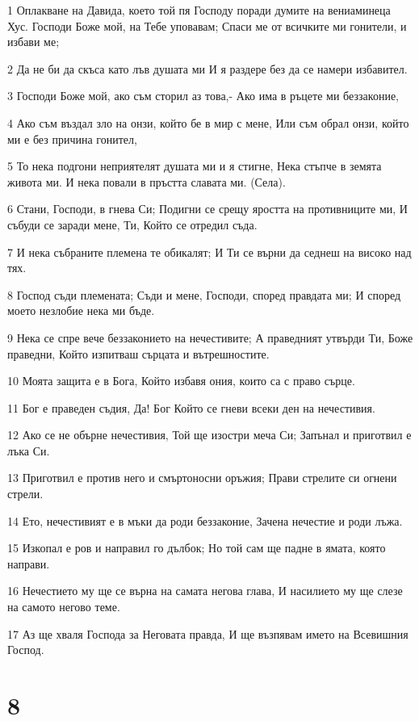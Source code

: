 \par 1 Оплакване на Давида, което той пя Господу поради думите на вениаминеца Хус. Господи Боже мой, на Тебе уповавам; Спаси ме от всичките ми гонители, и избави ме;
\par 2 Да не би да скъса като лъв душата ми И я раздере без да се намери избавител.
\par 3 Господи Боже мой, ако съм сторил аз това,- Ако има в ръцете ми беззаконие,
\par 4 Ако съм въздал зло на онзи, който бе в мир с мене, Или съм обрал онзи, който ми е без причина гонител,
\par 5 То нека подгони неприятелят душата ми и я стигне, Нека стъпче в земята живота ми. И нека повали в пръстта славата ми. (Села).
\par 6 Стани, Господи, в гнева Си; Подигни се срещу яростта на противниците ми, И събуди се заради мене, Ти, Който се отредил съда.
\par 7 И нека събраните племена те обикалят; И Ти се върни да седнеш на високо над тях.
\par 8 Господ съди племената; Съди и мене, Господи, според правдата ми; И според моето незлобие нека ми бъде.
\par 9 Нека се спре вече беззаконието на нечестивите; А праведният утвърди Ти, Боже праведни, Който изпитваш сърцата и вътрешностите.
\par 10 Моята защита е в Бога, Който избавя ония, които са с право сърце.
\par 11 Бог е праведен съдия, Да! Бог Който се гневи всеки ден на нечестивия.
\par 12 Ако се не обърне нечестивия, Той ще изостри меча Си; Запънал и приготвил е лъка Си.
\par 13 Приготвил е против него и смъртоносни оръжия; Прави стрелите си огнени стрели.
\par 14 Ето, нечестивият е в мъки да роди беззаконие, Зачена нечестие и роди лъжа.
\par 15 Изкопал е ров и направил го дълбок; Но той сам ще падне в ямата, която направи.
\par 16 Нечестието му ще се върна на самата негова глава, И насилието му ще слезе на самото негово теме.
\par 17 Аз ще хваля Господа за Неговата правда, И ще възпявам името на Всевишния Господ.

\chapter{8}

